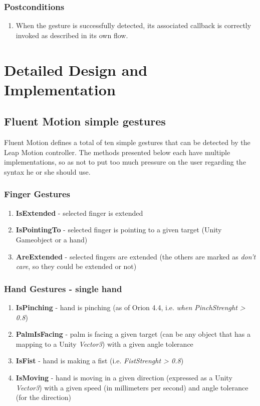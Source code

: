\documentclass[12pt,a4paper,twoside]{report}
\begin{document}
\subsection{Postconditions}

\begin{enumerate}
  \item When the gesture is successfully detected, its associated callback is correctly invoked as described in its own flow.
\end{enumerate}

\chapter{Detailed Design and Implementation}

\section{Fluent Motion simple gestures}

Fluent Motion defines a total of ten simple gestures that can be detected by the Leap Motion controller. The methods presented below each have multiple implementations, so as not to put too much pressure on the user regarding the syntax he or she should use.

\subsection{Finger Gestures}
\begin{enumerate}
  \item \textbf{IsExtended} - selected finger is extended
  \item \textbf{IsPointingTo} - selected finger is pointing to a given target (Unity Gameobject or a hand)
  \item \textbf{AreExtended} - selected fingers are extended (the others are marked as \textit{don't care}, so they could be extended or not)
\end{enumerate}

\subsection{Hand Gestures - single hand}

\begin{enumerate}
  \item \textbf{IsPinching} - hand is pinching (as of Orion 4.4, i.e. \textit{when PinchStrenght > 0.8})
  \item \textbf{PalmIsFacing} - palm is facing a given target (can be any object that has a mapping to a Unity \textit{Vector3}) with a given angle tolerance
  \item  \textbf{IsFist} - hand is making a fist (i.e. \textit{FistStrenght > 0.8})
  \item \textbf{IsMoving} - hand is moving in a given direction (expressed as a Unity \textit{Vector3}) with a given speed (in millimeters per second) and angle tolerance (for the direction) 
\end{enumerate}
\end{document}
